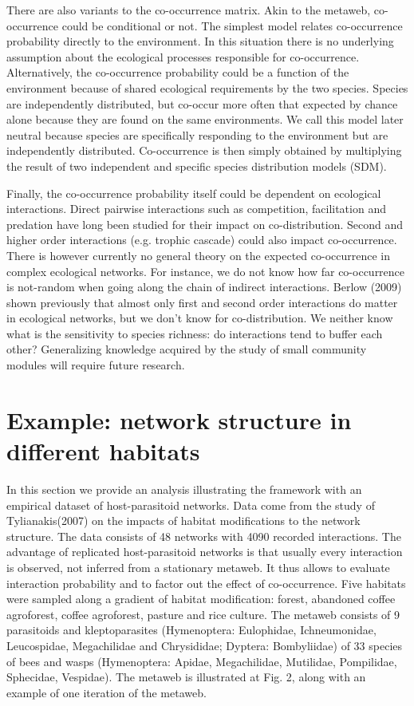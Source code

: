 \documentclass[12pt]{article}
\begin{document}
There are also variants to the co-occurrence matrix. Akin to the metaweb,
co-occurrence could be conditional or not. The simplest model relates
co-occurrence probability directly to the environment. In this situation there
is no underlying assumption about the ecological processes responsible for
co-occurrence. Alternatively, the co-occurrence probability could be a function
of the environment because of shared ecological requirements by the two species.
Species are independently distributed, but co-occur more often that expected by
chance alone because they are found on the same environments. We call this model
later neutral because species are specifically responding to the environment but
are independently distributed. Co-occurrence is then simply obtained by
multiplying the result of two independent and specific species distribution
models (SDM).

Finally, the co-occurrence probability itself could be dependent on ecological
interactions. Direct pairwise interactions such as competition, facilitation and
predation have long been studied for their impact on co-distribution. Second and
higher order interactions (e.g. trophic cascade) could also impact
co-occurrence. There is however currently no general theory on the expected
co-occurrence in complex ecological networks. For instance, we do not know how
far co-occurrence is not-random when going along the chain of indirect
interactions. Berlow (2009) shown previously that almost only first and second
order interactions do matter in ecological networks, but we don't know for
co-distribution. We neither know what is the sensitivity to species richness: do
interactions tend to buffer each other? Generalizing knowledge acquired by the
study of small community modules will require future research.

\newpage
\section*{Example: network structure in different habitats}

In this section we provide an analysis illustrating the framework with an
empirical dataset of host-parasitoid networks. Data come from the study of
Tylianakis(2007) on the impacts of habitat modifications to the network
structure. The data consists of 48 networks with 4090 recorded interactions. The
advantage of replicated host-parasitoid networks is that usually every
interaction is observed, not inferred from a stationary metaweb. It thus allows
to evaluate interaction probability and to factor out the effect of
co-occurrence. Five habitats were sampled along a gradient of habitat
modification: forest, abandoned coffee agroforest, coffee agroforest, pasture
and rice culture. The metaweb consists of 9 parasitoids and kleptoparasites
(Hymenoptera: Eulophidae, Ichneumonidae, Leucospidae, Megachilidae and
Chrysididae; Dyptera: Bombyliidae) of 33 species of bees and wasps (Hymenoptera:
Apidae, Megachilidae, Mutilidae, Pompilidae, Sphecidae, Vespidae). The metaweb
is illustrated at Fig. 2, along with an example of one iteration of the metaweb.
\end{document}
